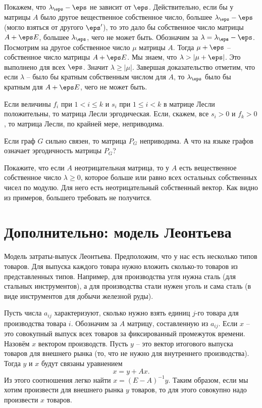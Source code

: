 Покажем, что $\lambda_{\eps}-\eps$ не зависит от $\eps$. Действительно, если бы у матрицы $A$ было другое вещественное собственное число, большее $\lambda_{\eps} - \eps$ (могло взяться от другого $\eps'$), то это дало бы собственное число матрицы $A+\eps E$, большее $\lambda_{\eps}$, чего не может быть. Обозначим за $\lambda=\lambda_{\eps}-\eps$.   Посмотрим на другое собственное число $\mu$ матрицы $A$. Тогда $\mu+\eps$ -- собственное число матрицы $A+\eps E$. Мы знаем, что $\lambda >|\mu+\eps|$. Это выполнено для всех $\eps$. Значит $\lambda \geq |\mu|$. Завершая доказательство отметим, что если $\lambda$ -- было бы кратным собственным числом для $A$, то $\lambda_{\eps}$ было бы кратным для $A+\eps E$, чего не может быть.
\endproof

\rm Если величины $f_i$ при $1<i\leq k$ и $s_i$ при $1\leq i<k$ в матрице Лесли положительны, то матрица Лесли эргодическая. Если, скажем, все $s_i>0$ и $f_k>0$, то матрица Лесли, по крайней мере, неприводима.

Если граф $G$ сильно связен, то матрица $P_G$ неприводима. А что на языке графов означает эргодичность матрицы $P_G$?
\erm


\upr Покажите, что если $A$ неотрицательная матрица, то у $A$ есть вещественное собственное число $\lambda\geq 0$, которое больше или равно всех остальных собственных чисел по модулю. Для него есть неотрицательный собственный вектор. Как видно из примеров, большего требовать не получится.
\eupr


\section{Дополнительно: модель Леонтьева}
Модель затраты-выпуск Леонтьева. Предположим, что у нас есть несколько типов товаров. Для выпуска каждого товара нужно вложить сколько-то товаров из представленных типов. Например, для производства угля нужна сталь (для стальных инструментов), а для производства стали нужен уголь и сама сталь (в виде инструментов для добычи железной руды). 

Пусть числа $a_{ij}$ характеризуют, сколько нужно взять единиц $j$-го товара для производства товара $i$. Обозначим за $A$ матрицу, составленную из $a_{ij}$. Если $x$ -- это совокупный выпуск всех товаров за фиксированный промежуток времени. Назовём $x$ вектором производств. Пусть $y$ -- это вектор итогового выпуска товаров для внешнего рынка (то, что не нужно для внутреннего производства). Тогда $y$ и $x$ будут связаны уравнением
$$x=y+Ax.$$
Из этого соотношения легко найти $x=(E-A)^{-1}y$. Таким образом, если мы хотим произвести для внешнего рынка $y$ товаров, то для этого совокупно надо произвести $x$ товаров. 

